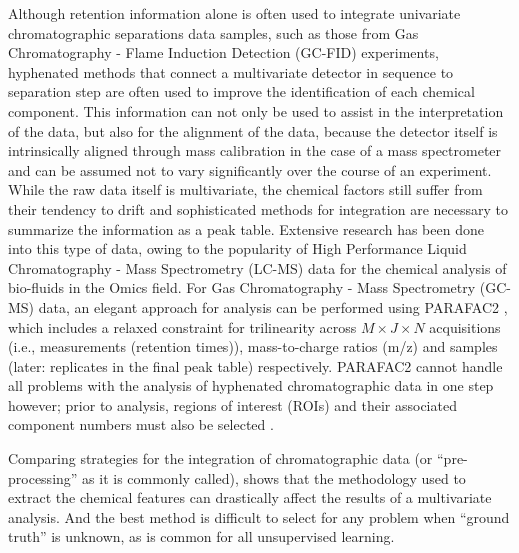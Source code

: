\documentclass[preprint,12pt]{elsarticle}
\begin{document}
Although retention information alone is often used to integrate univariate chromatographic separations data samples, such as those from Gas Chromatography - Flame Induction Detection (GC-FID) experiments, hyphenated methods that connect a multivariate detector in sequence to separation step are often used to improve the identification of each chemical component. This information can not only be used to assist in the interpretation of the data, but also for the alignment of the data, because the detector itself is intrinsically aligned through mass calibration in the case of a mass spectrometer and can be assumed not to vary significantly over the course of an experiment. While the raw data itself is multivariate, the chemical factors still suffer from their tendency to drift and sophisticated methods for integration are necessary to summarize the information as a peak table. Extensive research has been done into this type of data, owing to the popularity of High Performance Liquid Chromatography - Mass Spectrometry (LC-MS) data for the chemical analysis of bio-fluids in the Omics field. For Gas Chromatography - Mass Spectrometry (GC-MS) data, an elegant approach for analysis can be performed using PARAFAC2 \cite{kiers1999parafac2}, which includes a relaxed constraint for trilinearity across $M \times J \times N$ acquisitions (i.e., measurements (retention times)), mass-to-charge ratios (m/z) and samples (later: replicates in the final peak table) respectively. PARAFAC2 cannot handle all problems with the analysis of hyphenated chromatographic data in one step however; prior to analysis, regions of interest (ROIs) and their associated component numbers must also be selected \cite{baccolo2021untargeted,giebelhaus2022untargeted}.

Comparing strategies for the integration of chromatographic data (or ``pre-processing'' as it is commonly called), shows that the methodology used to extract the chemical features can drastically affect the results of a multivariate analysis\cite{weggler2021unique}. And the best method is difficult to select for any problem when ``ground truth'' is unknown, as is common for all unsupervised learning.


\end{document}
